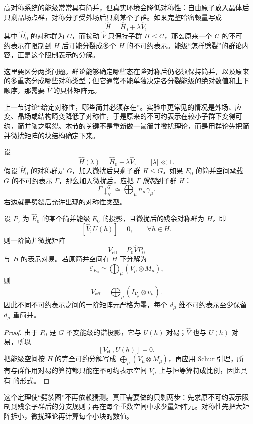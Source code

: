 高对称系统的能级常常具有简并，但真实环境会降低对称性：自由原子放入晶体后只剩晶场点群，对称分子受外场后只剩某个子群。如果完整哈密顿量写成
\[
\hat H=\hat H_0+\lambda\hat V,
\]
其中 $\hat H_0$ 的对称群为 $G$，而扰动 $\hat V$ 只保持子群 $H\leqslant G$，那么原来一个 $G$ 的不可约表示在限制到 $H$ 后可能分裂成多个 $H$ 的不可约表示。能级“怎样劈裂”的群论内容，正是这个限制表示的分解。

这里要区分两类问题。群论能够确定哪些态在降对称后仍必须保持简并，以及原来的多重态分成哪些对称类型；但它通常不能单独决定各分裂能级的绝对数值和上下顺序，那需要 $\hat V$ 的具体矩阵元。

上一节讨论“给定对称性，哪些简并必须存在”。实验中更常见的情况是外场、应变、晶场或结构畸变降低了对称性，于是原来的不可约表示在较小子群下变得可约，简并随之劈裂。本节的关键不是重新做一遍简并微扰理论，而是用群论先把简并微扰矩阵的块结构确定下来。

设
\[
\hat H(\lambda)=\hat H_0+\lambda\hat V,
\qquad |\lambda|\ll1.
\]
假设 $\hat H_0$ 的对称群是 $G$，加入微扰后只剩子群 $H\leqslant G$。如果 $E_0$ 的简并空间承载 $G$ 的不可约表示 $\Gamma$，那么加入微扰后，应把 $\Gamma$ \emph{限制}到子群 $H$：
\[
\Gamma\downarrow_H^G
\simeq\bigoplus_\mu n_\mu\,\gamma_\mu.
\label{eq:branching-rule}
\]
右边就是劈裂后允许出现的对称性类型。

\begin{theorem}[对称性降低与一阶劈裂的分块结构]
设 $P_0$ 为 $\hat H_0$ 的某个简并能级 $E_0$ 的投影，且微扰后的残余对称群为 $H$，即
\[
[\hat V,U(h)]=0,
\qquad \forall h\in H.
\]
则一阶简并微扰矩阵
\[
V_{\mathrm{eff}}=P_0\hat V P_0
\]
与 $H$ 的表示对易。若原简并空间在 $H$ 下分解为
\[
\mathcal E_{E_0}\simeq\bigoplus_\mu(V_\mu\otimes M_\mu),
\]
则
\[
V_{\mathrm{eff}}
=\bigoplus_\mu(I_{V_\mu}\otimes v_\mu).
\label{eq:perturbation-block}
\]
因此不同不可约表示之间的一阶矩阵元严格为零，每个 $d_\mu$ 维不可约表示至少保留 $d_\mu$ 重简并。
\label{thm:perturbation-block-structure}

\end{theorem}

\begin{proof}
由于 $P_0$ 是 $G$-不变能级的谱投影，它与 $U(h)$ 对易；$\hat V$ 也与 $U(h)$ 对易，所以
\[
[V_{\mathrm{eff}},U(h)]=0.
\]
把能级空间按 $H$ 的完全可约分解写成 $\bigoplus_\mu(V_\mu\otimes M_\mu)$，再应用 Schur 引理，所有与群作用对易的算符都只能在不可约表示空间 $V_\mu$ 上与恒等算符成比例，因此具有  的形式。
\end{proof}

这个定理使“劈裂图”不再依赖猜测。真正需要做的只剩两步：先求原不可约表示限制到残余子群后的分支规则；再在每个重数空间中求少量矩阵元。对称性先把大矩阵拆小，微扰理论再计算每个小块的数值。

